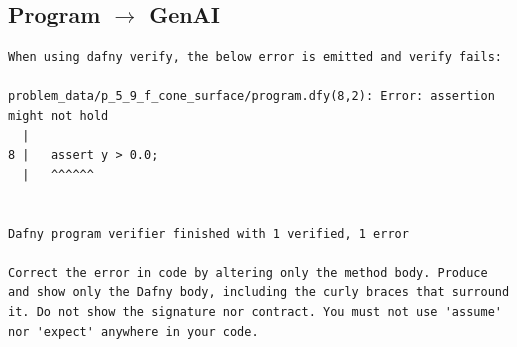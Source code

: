 \documentclass{article}
\begin{document}
\subsection*{Program $\rightarrow$ GenAI}
\begin{lstlisting}
When using dafny verify, the below error is emitted and verify fails:

problem_data/p_5_9_f_cone_surface/program.dfy(8,2): Error: assertion might not hold
  |
8 |   assert y > 0.0;
  |   ^^^^^^


Dafny program verifier finished with 1 verified, 1 error

Correct the error in code by altering only the method body. Produce and show only the Dafny body, including the curly braces that surround it. Do not show the signature nor contract. You must not use 'assume' nor 'expect' anywhere in your code.
\end{lstlisting}
\end{document}
